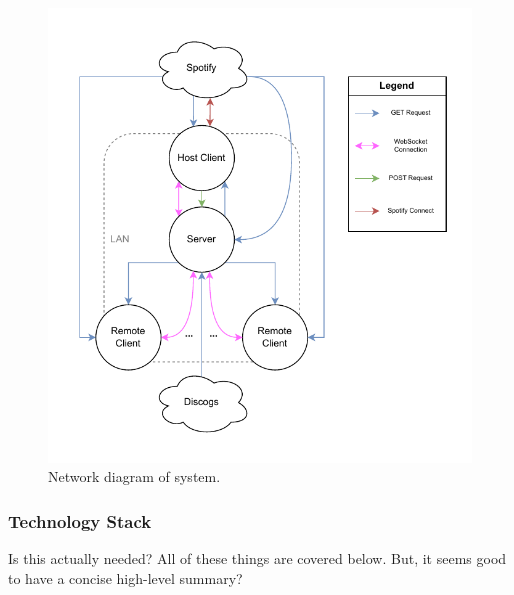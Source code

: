                 \begin{figure}[h]
                    \centering
                    \includegraphics[width=\textwidth]{images/VTT_network.NetworkDiagram.pdf}
                    \caption{Network diagram of system. }
                    \label{fig:networkDiagram}
                \end{figure}
        
            \subsubsection{Technology Stack}
    
                \begin{temp}
                    Is this actually needed? All of these things are covered below. But, it seems good to have a concise high-level summary?
                \end{temp}
                
